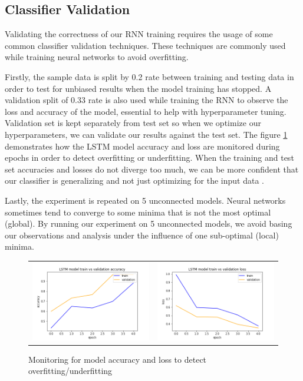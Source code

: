 \subsection{Classifier Validation}

Validating the correctness of our RNN training requires the usage of some common classifier validation techniques. These techniques are commonly used while training neural networks to avoid overfitting. 

Firstly, the sample data is split by 0.2 rate between training and testing data in order to test for unbiased results when the model training has stopped. A validation split of 0.33 rate is also used while training the RNN to observe the loss and accuracy of the model, essential to help with hyperparameter tuning. Validation set is kept separately from test set so when we optimize our hyperparameters, we can validate our results against the test set. The figure \ref{model-validation-monitoring} demonstrates how the LSTM model accuracy and loss are monitored during epochs in order to detect overfitting or underfitting. When the training and test set accuracies and losses do not diverge too much, we can be more confident that our classifier is generalizing and not just optimizing for the input data \cite{deep-learning-cookbook}.

Lastly, the experiment is repeated on 5 unconnected models. Neural networks sometimes tend to converge to some minima that is not the most optimal (global). By running our experiment on 5 unconnected models, we avoid basing our observations and analysis under the influence of one sub-optimal (local) minima. 

\begin{figure}
   \centering
\begin{tabular}{cc}
\includegraphics[width=7.5cm]{images/classifier/model-train-vs-validation-accuracy}&
\includegraphics[width=7.5cm]{images/classifier/model-train-vs-validation-loss}\\
\end{tabular}
    \caption{Monitoring for model accuracy and loss to detect overfitting/underfitting}
    \label{model-validation-monitoring}
\end{figure}

